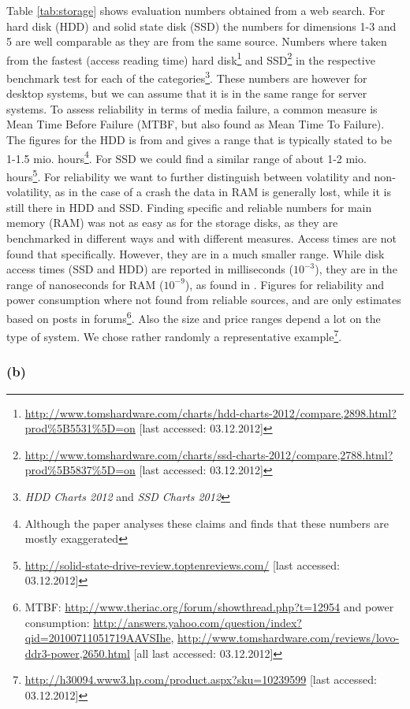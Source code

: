 \documentclass[12pt,a4paper]{article}
\begin{document}
Table \ref{tab:storage} shows evaluation numbers obtained from a web search. For hard disk (HDD) and solid state disk (SSD) the numbers for dimensions 1-3 and 5 are well comparable as they are from the same source. Numbers where taken from the fastest (access reading time) hard disk\footnote{\url{http://www.tomshardware.com/charts/hdd-charts-2012/compare,2898.html?prod\%5B5531\%5D=on} [last accessed: 03.12.2012]} and SSD\footnote{\url{http://www.tomshardware.com/charts/ssd-charts-2012/compare,2788.html?prod\%5B5837\%5D=on} [last accessed: 03.12.2012]} in the respective benchmark test for each of the categories\footnote{\emph{HDD Charts 2012} and \emph{SSD Charts 2012}}. These numbers are however for desktop systems, but we can assume that it is in the same range for server systems. To assess reliability in terms of media failure, a common measure is Mean Time Before Failure (MTBF, but also found as Mean Time To Failure). The figures for the HDD is from \cite{Schroeder2007} and gives a range that is typically stated to be 1-1.5 mio. hours\footnote{Although the paper analyses these claims and finds that these numbers are mostly exaggerated}. For SSD we could find a similar range of about 1-2 mio. hours\footnote{\url{http://solid-state-drive-review.toptenreviews.com/} [last accessed: 03.12.2012]}. For reliability we want to further distinguish between volatility and non-volatility, as in the case of a crash the data in RAM is generally lost, while it is still there in HDD and SSD. Finding specific and reliable numbers for main memory (RAM) was not as easy as for the storage disks, as they are benchmarked in different ways and with different measures. Access times are not found that specifically. However, they are in a much smaller range. While disk access times (SSD and HDD) are reported in milliseconds ($10^{-3}$), they are in the range of nanoseconds for RAM ($10^{-9}$), as found in \cite{Dean}. Figures for reliability and power consumption where not found from reliable sources, and are only estimates based on posts in forums\footnote{MTBF: \url{http://www.theriac.org/forum/showthread.php?t=12954} and power consumption: \url{http://answers.yahoo.com/question/index?qid=20100711051719AAVSIhe},
\url{http://www.tomshardware.com/reviews/lovo-ddr3-power,2650.html} [all last accessed: 03.12.2012]}. Also the size and price ranges depend a lot on the type of system. We chose rather randomly a representative example\footnote{\url{http://h30094.www3.hp.com/product.aspx?sku=10239599} [last accessed: 03.12.2012]}.

\subsubsection*{(b)}
\end{document}
